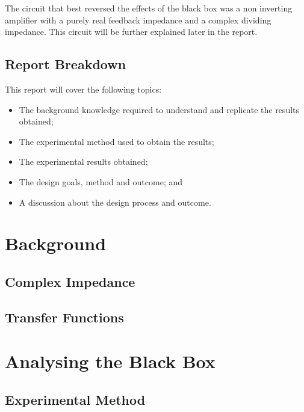 \documentclass[12pt]{article} %
\begin{document}
The circuit that best reversed the effects of the black box was a non inverting amplifier with a purely real feedback impedance and a complex dividing impedance. This circuit will be further explained later in the report.

\subsection{Report Breakdown}

This report will cover the following topics:
\begin{itemize} \itemsep1pt
	\item The background knowledge required to understand and replicate the results obtained;
	\item The experimental method used to obtain the results;
	\item The experimental results obtained;
	\item The design goals, method and outcome; and
	\item A discussion about the design process and outcome.
\end{itemize}

\pagebreak





\section{Background}

\subsection{Complex Impedance}



\subsection{Transfer Functions}


\pagebreak





\section{Analysing the Black Box}

\subsection{Experimental Method}
\end{document}
